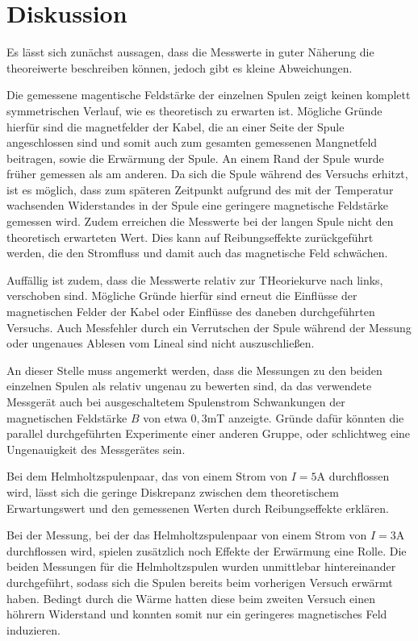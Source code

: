 \section{Diskussion}
\label{sec:Diskussion}
Es lässt sich zunächst aussagen, dass die Messwerte in guter Näherung die theoreiwerte
beschreiben können, jedoch gibt es kleine Abweichungen.

Die gemessene magentische Feldstärke der einzelnen Spulen zeigt keinen komplett
symmetrischen Verlauf, wie es theoretisch zu erwarten ist. Mögliche Gründe hierfür sind
die magnetfelder der Kabel, die an einer Seite der Spule angeschlossen sind und somit
auch zum gesamten gemessenen Mangnetfeld beitragen, sowie die Erwärmung der Spule.
An einem Rand der Spule wurde früher gemessen als am anderen. Da sich die Spule
während des Versuchs erhitzt, ist es möglich, dass zum späteren Zeitpunkt aufgrund des
mit der Temperatur wachsenden Widerstandes in der Spule eine geringere magnetische
Feldstärke gemessen wird. Zudem erreichen die Messwerte bei der langen Spule nicht
den theoretisch erwarteten Wert. Dies kann auf Reibungseffekte zurückgeführt werden,
die den Stromfluss und damit auch das magnetische Feld schwächen.

Auffällig ist zudem, dass die Messwerte relativ zur THeoriekurve nach links, verschoben sind.
Mögliche Gründe hierfür sind erneut die Einflüsse der magnetischen Felder der Kabel oder
Einflüsse des daneben durchgeführten Versuchs. Auch Messfehler durch ein Verrutschen
der Spule während der Messung oder ungenaues Ablesen vom Lineal sind nicht auszuschließen.

An dieser Stelle muss angemerkt werden, dass die Messungen zu den beiden einzelnen Spulen
als relativ ungenau zu bewerten sind, da das verwendete Messgerät auch bei ausgeschaltetem
Spulenstrom Schwankungen der magnetischen Feldstärke $B$ von etwa $0,3$mT anzeigte.
Gründe dafür könnten die parallel durchgeführten Experimente einer anderen Gruppe,
oder schlichtweg eine Ungenauigkeit des Messgerätes sein.

Bei dem Helmholtzspulenpaar, das von einem
Strom von $I=5$A durchflossen wird, lässt sich die geringe Diskrepanz zwischen dem
theoretischem Erwartungswert und den gemessenen Werten durch Reibungseffekte erklären.

Bei der Messung, bei der das Helmholtzspulenpaar von einem Strom von $I=3$A durchflossen
wird, spielen zusätzlich noch Effekte der Erwärmung eine Rolle. Die beiden Messungen
für die Helmholtzspulen wurden unmittlebar hintereinander durchgeführt, sodass sich die
Spulen bereits beim vorherigen Versuch erwärmt haben. Bedingt durch die Wärme
hatten diese beim zweiten Versuch einen höhrern Widerstand und konnten somit nur ein
geringeres magnetisches Feld induzieren.

